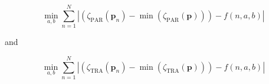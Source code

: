\begin{equation}
	\min_{a, b} \sum_{n=1}^{N} \left|\left(\zeta_\text{PAR}(\textbf{p}_n) - \min(\zeta_\text{PAR}(\textbf{p}))\right) - f(n, a, b)\right|	
	\label{ch3:equ:find-exponential-par}
\end{equation}

and

\begin{equation}
	\min_{a, b} \sum_{n=1}^{N} \left|\left(\zeta_\text{TRA}(\textbf{p}_n) - \min(\zeta_\text{TRA}(\textbf{p}))\right) - f(n, a, b)\right|	
	\label{ch3:equ:find-exponential-tra}	
\end{equation}